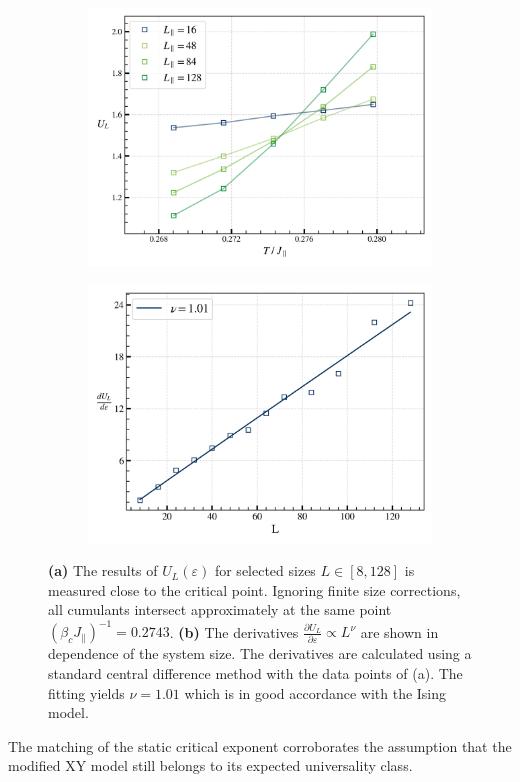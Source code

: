 	\begin{figure}[tbh]
		\begin{subfigure}{0.475\textwidth}
			\centering
			\includegraphics[width=0.95\linewidth]{graphics/slope-at-critical-point-3.png}
		\end{subfigure}
		\begin{subfigure}{0.475\textwidth}
			\centering
			\includegraphics[width=0.95\linewidth]{graphics/nu-2.png}
		\end{subfigure}
		\caption{\textbf{(a)} The results of ${U}_L(\varepsilon)$ for selected sizes $L \in \left[8, 128\right]$ is measured close to the critical point. Ignoring finite size corrections, all cumulants intersect approximately at the same point $(\beta_c J_\parallel)^{-1} = 0.2743$. \textbf{(b)} The derivatives $\frac{\partial U_L}{\partial \varepsilon} \propto L^\nu$ are shown in dependence of the system size. The derivatives are calculated using a standard central difference method with the data points of (a). The fitting yields $\nu = 1.01$ which is in good accordance with the Ising model.}
		\label{Fig::Binder-Cum-Result}
	\end{figure}
	The matching of the static critical exponent corroborates the assumption that the modified XY model still belongs to its expected universality class. \\

